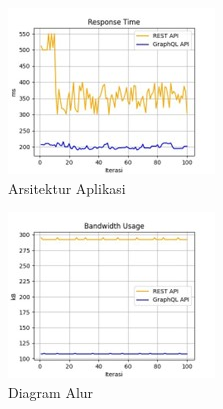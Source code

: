 \documentclass[
 manuscript=article,  %
  layout=publish, 
  year=2024, 
  month= Februari, %
  volume=8,
  number=1 
]{JIKO}
\begin{document}
\noindent
\begin{minipage}{0.48\textwidth}
    \begin{figure}[H]
        \centering
        \includegraphics[width=\textwidth]{assets/Picture5.jpg}
        \caption{Arsitektur Aplikasi}
        \label{fig:arsitektur}
    \end{figure}
\end{minipage}%
\hspace{0.04\textwidth}
\begin{minipage}{0.48\textwidth}
    \begin{figure}[H]
        \centering
        \includegraphics[width=\textwidth]{assets/Picture6.jpg}
        \caption{Diagram Alur}
        \label{fig:diagram}
    \end{figure}
\end{minipage}
\end{document}
